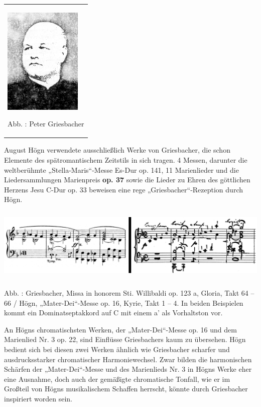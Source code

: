 \documentclass[a4paper]{article}
\newcounter{Abb}
\renewcommand\theAbb{\arabic{Abb}}
\begin{document}
\begin{center}
\begin{minipage}{4.076cm}
\begin{flushleft}
\tablefirsthead{}
\tablehead{}
\tabletail{}
\tablelasttail{}
\begin{supertabular}{m{3.8760002cm}}

\includegraphics[width=3.694cm,height=5.106cm]{pictures/zulassungsarbeit-img091.jpg}

Abb. \stepcounter{Abb}{\theAbb}: Peter Griesbacher\\
\end{supertabular}
\end{flushleft}
\end{minipage}
\end{center}
August Högn verwendete ausschließlich Werke von Griesbacher, die schon
Elemente des spätromantischem Zeitstils in sich tragen. 4 Messen,
darunter die weltberühmte „Stella-Maris“-Messe Es-Dur op. 141, 11
Marienlieder und die Liedersammlungen Marienpreis \textbf{\textmd{op.
37} }sowie die Lieder zu Ehren des göttlichen Herzens Jesu C-Dur op. 33
beweisen eine rege „Griesbacher“-Rezeption durch Högn.


\includegraphics[width=15.977cm,height=3.53cm]{pictures/zulassungsarbeit-img092.png}


Abb. \stepcounter{Abb}{\theAbb}: Griesbacher, Missa in honorem Sti.
Willibaldi op. 123 a, Gloria, Takt 64 – 66 / Högn, „Mater-Dei“-Messe
op. 16, Kyrie, Takt 1 – 4. In beiden Beispielen kommt ein
Dominatseptakkord auf C mit einem a’ als Vorhaltston vor.

An Högns chromatischsten Werken, der „Mater-Dei“-Messe op. 16 und dem
Marienlied Nr. 3 op. 22, sind Einflüsse Griesbachers kaum zu übersehen.
Högn bedient sich bei diesen zwei Werken ähnlich wie Griesbacher
scharfer und ausdrucksstarker chromatischer Harmoniewechsel. Zwar
bilden die harmonischen Schärfen der „Mater-Dei“-Messe und des
Marienlieds Nr. 3 in Högns Werke eher eine Ausnahme, doch auch der
gemäßigte chromatische Tonfall, wie er im Großteil von Högns
musikalischem Schaffen herrscht, könnte durch Griesbacher inspiriert
worden sein.
\end{document}
